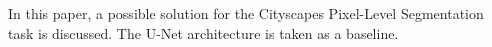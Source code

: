 In this paper, a possible solution for the Cityscapes Pixel-Level Segmentation task is discussed.
The U-Net architecture is taken as a baseline.